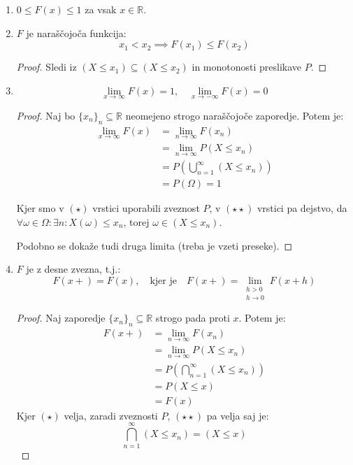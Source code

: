 \documentclass[12pt]{book}
\theoremstyle{definition}
\theoremstyle{plain}
\theoremstyle{plain}
\theoremstyle{plain}
\theoremstyle{remark}
\begin{document}
\begin{enumerate}
    \item $0 \leq F(x) \leq 1$ za vsak $x\in \mathbb{R}.$
    \item $F$ je naraščojoča funkcija: 
    $$
    x_1 < x_2 \implies F(x_1) \leq F(x_2)
    $$
    \begin{proof}
        Sledi iz $\left(X \leq x_1\right) \subseteq\left(X \leq x_2\right)$ in monotonosti preslikave $P$.
    \end{proof}
    \item 
    $$
    \lim _{x \to \infty} F(x)=1, \quad \lim _{x \to -\infty} F(x)=0
    $$
    \begin{proof}
        Naj bo $\{x_n\}_n \subseteq \mathbb{R}$ neomejeno strogo naraščojoče zaporedje. Potem je: 
        \begin{align*}
            \lim _{x \to \infty} F(x) &= \lim _{n \to \infty} F\left(x_n\right) \\
            &=\lim _{n \to \infty} P\left(X \leq x_n\right) \\
            &=P\left(\bigcup_{n=1}^{\infty}\left(X \leq x_n\right)\right) \tag{$\star$} \\
            &=P(\Omega)=1 \tag{$\star \star$}
        \end{align*}
        
        Kjer smo v $(\star)$ vrstici uporabili zveznost $P$, v $(\star \star)$ vrstici pa dejstvo, da $\forall \omega \in \Omega: \exists n: X(\omega) \leq x_n$, torej $\omega \in\left(X \leq x_n\right)$. 

        Podobno se dokaže tudi druga limita (treba je vzeti preseke).
    \end{proof}
    \item $F$ je z desne zvezna, t.j.:
    $$
    F(x+)=F(x), \quad \text{kjer je} \quad F(x+)=\lim _{\substack{h > 0 \\ h \to 0}} F(x+h)
    $$
    \begin{proof}
        Naj zaporedje $\{x_n\}_n \subseteq \mathbb{R}$ strogo pada proti $x$. Potem je:
        \begin{align*}
            F(x+)&=\lim _{n \to \infty} F\left(x_n\right) \\
            &=\lim _{n \rightarrow \infty} P\left(X \leq x_n\right) \\
            &=P\left(\bigcap_{n=1}^{\infty}\left(X \leq x_n\right)\right) \tag{$\star$} \\
            &=P(X \leq x) \tag{$\star \star$} \\
            &=F(x)
        \end{align*}
        Kjer $(\star)$ velja, zaradi zveznosti $P$, $(\star \star)$ pa velja saj je: $$\bigcap_{n=1}^{\infty}\left(X \leq x_n\right)=(X \leq x)$$


\end{proof}
\end{enumerate}
\end{document}
